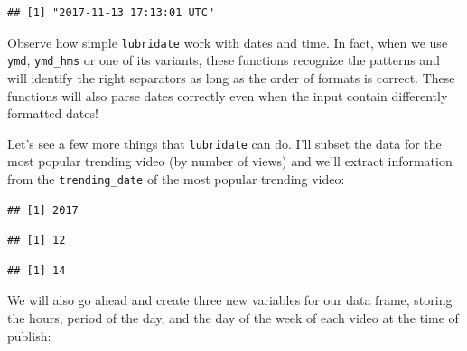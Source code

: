 \documentclass[]{article}
\newenvironment{Shaded}{\begin{snugshade}}{\end{snugshade}}
\newcommand{\KeywordTok}[1]{\textcolor[rgb]{0.13,0.29,0.53}{\textbf{#1}}}
\newcommand{\NormalTok}[1]{#1}
\newcommand{\OperatorTok}[1]{\textcolor[rgb]{0.81,0.36,0.00}{\textbf{#1}}}
\newcommand{\StringTok}[1]{\textcolor[rgb]{0.31,0.60,0.02}{#1}}
\begin{document}
\begin{verbatim}
## [1] "2017-11-13 17:13:01 UTC"
\end{verbatim}

Observe how simple \texttt{lubridate} work with dates and time. In fact,
when we use \texttt{ymd}, \texttt{ymd\_hms} or one of its variants,
these functions recognize the patterns and will identify the right
separators as long as the order of formats is correct. These functions
will also parse dates correctly even when the input contain differently
formatted dates!

Let's see a few more things that \texttt{lubridate} can do. I'll subset
the data for the most popular trending video (by number of views) and
we'll extract information from the \texttt{trending\_date} of the most
popular trending video:

\begin{Shaded}
\end{Shaded}

\begin{verbatim}
## [1] 2017
\end{verbatim}

\begin{Shaded}
\end{Shaded}

\begin{verbatim}
## [1] 12
\end{verbatim}

\begin{Shaded}
\end{Shaded}

\begin{verbatim}
## [1] 14
\end{verbatim}

We will also go ahead and create three new variables for our data frame,
storing the hours, period of the day, and the day of the week of each
video at the time of publish:
\end{document}
